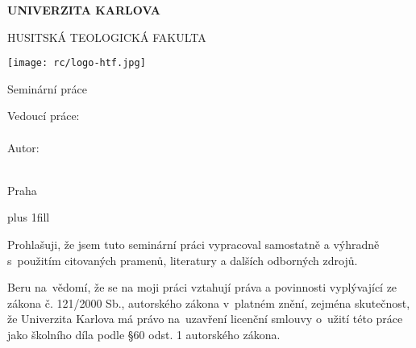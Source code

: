 

\pagestyle{empty}
\hypersetup{pageanchor=false}

\begin{center}

{\bf\Large UNIVERZITA KARLOVA}

\vfill

{\Large HUSITSKÁ TEOLOGICKÁ FAKULTA}

\vfill

\centerline{\mbox{\texttt{[image: rc/logo-htf.jpg]}}}

\vfill

{\bfseries\NazevPrace}

\vfill

{\bfseries\NazevPraceEN}

\vfill

Seminární práce

\vspace{15mm}

\begin{multicols}{2}
Vedoucí práce:\\
\Vedouci\\
\columnbreak
Autor:\\
\AutorPrace\\
\end{multicols}

\vfill

Praha \RokOdevzdani

\end{center}

\newpage


\openright
\hypersetup{pageanchor=true}
\pagestyle{plain}
\vglue 0pt plus 1fill

\noindent
Prohlašuji, že jsem tuto seminární práci vypracoval samostatně a výhradně
s~použitím citovaných pramenů, literatury a dalších odborných zdrojů.

\medskip\noindent
Beru na~vědomí, že se na moji práci vztahují práva a povinnosti vyplývající
ze zákona č. 121/2000 Sb., autorského zákona v~platném znění, zejména skutečnost,
že Univerzita Karlova má právo na~uzavření licenční smlouvy o~užití této
práce jako školního díla podle §60 odst. 1 autorského zákona.

\vspace{10mm}

